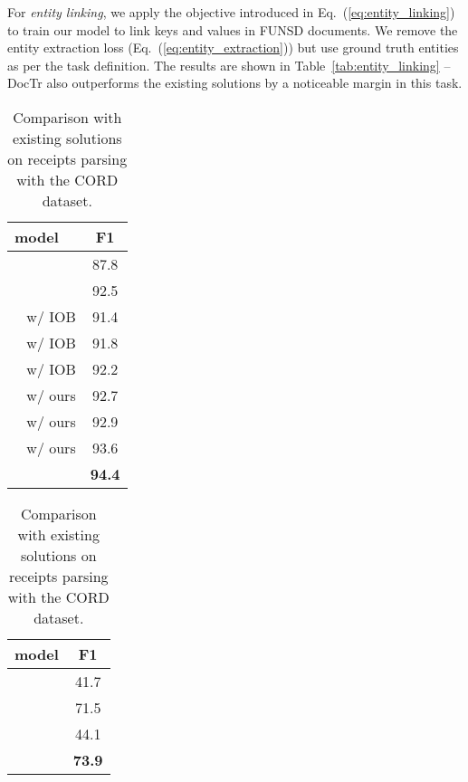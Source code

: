 For \textit{entity linking}, we apply the objective introduced in Eq.~(\ref{eq:entity_linking}) to train our model to link keys and values in FUNSD documents. We remove the entity extraction loss (Eq.~(\ref{eq:entity_extraction})) but use ground truth entities as per the task definition. The results are shown in Table~\ref{tab:entity_linking} -- DocTr also outperforms the existing solutions by a noticeable margin in this task.


\begin{table}[t]
\captionsetup{font=footnotesize}
\begin{minipage}{0.45\columnwidth}{
    \begin{center}
        \begin{tabular}{lc}
        \bf model & \bf F1 \\
        \midrule
        ~\cite{kim2022ocr}\textsuperscript{} & 87.8 \\
        ~\cite{hwang2020spatial} & 92.5 \\
        \midrule
        ~\cite{xu2021layoutlmv2} w/ IOB & 91.4 \\
        ~\cite{hong2021bros}  w/ IOB & 91.8 \\
        ~\cite{huang2022layoutlmv3}  w/ IOB & 92.2 \\
        \midrule
        ~\cite{xu2021layoutlmv2} w/ ours & 92.7 \\
        ~\cite{hong2021bros} w/ ours & 92.9 \\
        ~\cite{huang2022layoutlmv3} w/ ours & 93.6 \\
        \midrule
         & \bf{94.4} \\
        \end{tabular}
    \vspace{-.5em}
    \caption{Comparison with existing solutions on receipts parsing with the CORD dataset.}
    \label{tab:receipts_parsing}
    \end{center}
}\end{minipage}
\hspace{1em}
\begin{minipage}{0.45\columnwidth}{
    \begin{center}
        \begin{tabular}{lc}
            \multicolumn{1}{c}{\bf model} & \bf F1 \\
            \midrule
            ~\cite{hwang2020spatial}                  & 41.7  \\
            ~\cite{hong2021bros}                       & 71.5  \\
            ~\cite{li2021structext}              & 44.1  \\
                                           & \bf 73.9  \\


\end{tabular}
\end{center}}
\end{minipage}
\end{table}
